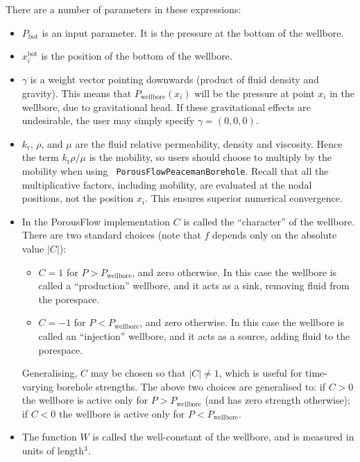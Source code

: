 \documentclass[12pt]{report}
\begin{document}
There are a number of parameters in these expressions:
\begin{itemize}
\item $P_{\mathrm{bot}}$ is an input parameter.  It is the pressure at
  the bottom of the wellbore.
\item $x_{i}^{\mathrm{bot}}$ is the position of the bottom of the wellbore.
\item $\gamma$ is a weight vector pointing downwards (product of fluid
  density and gravity).  This means that
  $P_{\mathrm{wellbore}}(x_{i})$ will be the pressure at point $x_{i}$
  in the wellbore, due to gravitational head.  If these
  gravitational effects are undesirable, the user may simply specify
  $\gamma = (0,0,0)$.
\item $k_{\mathrm{r}}$, $\rho$, and $\mu$ are the fluid
  relative permeability, density and viscosity.  Hence the term
  $k_{\mathrm{r}}\rho/\mu$ is the mobility, so users should choose to
  multiply by the mobility when using {\tt
    PorousFlowPeacemanBorehole}.  Recall that all the multiplicative
  factors, including mobility, are evaluated at
  the nodal positions, not the position $x_{i}$.  This ensures
  superior numerical convergence.
\item In the PorousFlow implementation $C$ is called the ``character'' of
  the wellbore.   There are two standard choices (note that $f$ depends only on
  the absolute value $|C|$):
\begin{itemize}
\item $C=1$ for $P>P_{\mathrm{wellbore}}$, and zero otherwise.  In
  this case the wellbore is called a ``production'' wellbore, and it
  acts as a sink, removing fluid from the porespace.
\item $C=-1$ for $P<P_{\mathrm{wellbore}}$, and zero otherwise.  In
  this case the wellbore is called an ``injection'' wellbore, and it
  acts as a source, adding fluid to the porespace.
\end{itemize}
Generalising, $C$ may be chosen so that $|C|\neq 1$, which is useful for
time-varying borehole strengths.  The above two choices are
generalised to: if $C>0$ the wellbore is active only for
$P>P_{\mathrm{wellbore}}$ (and has zero strength otherwise); if $C<0$
the wellbore is active only for $P<P_{\mathrm{wellbore}}$.
\item The function $W$ is called the well-constant of the wellbore, and is
measured in units of length$^{3}$.
\end{itemize}
\end{document}
